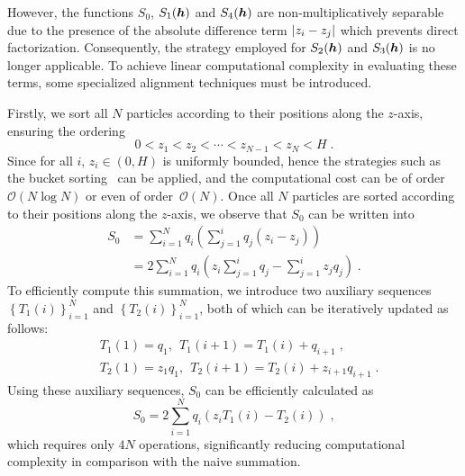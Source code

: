 However, the functions $S_0$,  $S_1(\boldsymbol{h})$ and $S_4(\boldsymbol{h})$  are non-multiplicatively separable due to the presence of the absolute difference term $\lvert z_i - z_j\rvert$ which prevents direct factorization. Consequently, the strategy employed for 
$S_2(\boldsymbol{h})$ and $S_3(\boldsymbol{h})$ is no longer applicable. To achieve linear computational complexity in evaluating these terms,  some specialized alignment techniques must be introduced.

Firstly, we sort all $N$ particles according to their positions along the 
$z$-axis, ensuring the ordering
\begin{equation*}
   0 < z_1 < z_2 <  \cdots <  z_{N - 1}<z_N < H\;.
\end{equation*}
Since for all  $i$, $z_i \in (0, H)$ is uniformly bounded, hence  the strategies such as the bucket sorting~\cite{corwin2004sorting} can be applied, and the computational cost can be of order~$\mathcal{O}(N \log{N})$ or even  of order~$\mathcal{O}(N)$. Once all $N$ particles are sorted according to their positions along the 
$z$-axis, we observe that $S_0$ can be written into
\begin{align*}
    S_0 
    & = \sum_{i = 1}^N q_i \left( \sum_{j = 1}^{i }{q_j (z_i - z_j)} \right) \\
    & = 2 \sum_{i = 1}^N q_i \left( z_i \sum_{j = 1}^{i }q_j - \sum_{j = 1}^{i }z_j q_j  \right) \;.
\end{align*}
To efficiently compute this summation, we introduce two auxiliary sequences  $\left\{T_1(i)\right\}_{i=1}^N$ and $\left\{T_2(i)\right\}_{i=1}^N$, both of which  can be iteratively updated as follows:
\begin{align*}
    &T_1(1)=q_1,~~T_1(i+1)=T_1(i)+q_{i+1}\;,\\
    &T_2(1)=z_1q_1,~~T_2(i+1)=T_2(i)+z_{i+1}q_{i+1}\;.
\end{align*}
Using these auxiliary sequences, 
$S_0$ can be efficiently calculated as
\[
S_0= 2 \sum_{i = 1}^N q_i \left( z_iT_1(i)-T_2(i)\right)\;,
\]
which requires only 
$4N$ operations, significantly reducing computational complexity in comparison with the naive summation.

